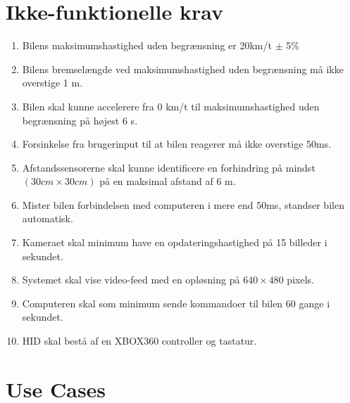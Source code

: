 \section{Ikke-funktionelle krav}
\begin{enumerate}
	\item Bilens maksimumshastighed uden begrænsning er 20km/t $\pm$ 5\% %
	\item Bilens bremselængde ved maksimumshastighed uden begrænsning må ikke overstige 1 m. %
	\item Bilen skal kunne accelerere fra 0 km/t til maksimumshastighed uden begrænsning på højest 6 s. %
	\item Forsinkelse fra brugerinput til at bilen reagerer må ikke overstige 50ms. %
	\item Afstandssensorerne skal kunne identificere en forhindring på mindst $(30cm \times 30cm)$ på en maksimal afstand af 6 m. %
	\item Mister bilen forbindelsen med computeren i mere end 50ms, standser bilen automatisk. 
	\item Kameraet skal minimum have en opdateringshastighed på 15 billeder i sekundet. %
	\item Systemet skal vise video-feed med en opløsning på $640 \times 480$ pixels.
	\item Computeren skal som minimum sende kommandoer til bilen 60 gange i sekundet. 
	\item HID skal bestå af en XBOX360 controller og tastatur.
\end{enumerate}

\newpage
\section{Use Cases}



\newpage


\newpage


\newpage


\newpage


\newpage


\newpage


\newpage


\newpage


\newpage


\newpage


\newpage


\newpage 
